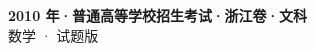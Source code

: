 \documentclass[zihao=-4, a4paper]{ctexart}
\begin{document}
\begin{center}
  {\Large\bfseries 2010 年·普通高等学校招生考试·浙江卷·文科}\\[4pt]
  {\large 数学 · 试题版}
\end{center}
\medskip
{}

\end{document}
